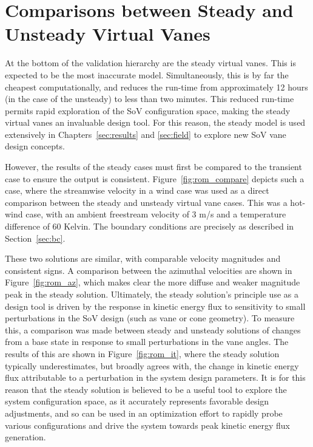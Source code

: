 \section{Comparisons between Steady and Unsteady Virtual Vanes}
\label{sec:steady_val}

At the bottom of the validation hierarchy are the steady virtual
vanes. This is expected to be the most inaccurate model. 
Simultaneously, this is by far the cheapest computationally, and 
reduces the run-time from approximately 12 hours (in the case of the
unsteady) to less than two minutes. This reduced run-time permits
rapid exploration of the SoV configuration space, making the steady
virtual vanes an invaluable design tool. For this reason, the steady
model is used extensively in Chapters~\ref{sec:results} and
\ref{sec:field} to explore new SoV vane design concepts. 

However, the results of the steady cases must first be
compared to the transient case to ensure the output is consistent. 
Figure~\ref{fig:rom_compare} depicts such a case, where the streamwise
velocity in a wind case was used as a direct comparison between the
steady and unsteady virtual vane cases. This was a hot-wind case, with
an ambient freestream velocity of 3 m/s and a temperature difference of 60
Kelvin. The boundary conditions are precisely as described in
Section~\ref{sec:bc}. 

These two solutions are similar, with comparable velocity magnitudes and 
consistent signs. A comparison between the azimuthal velocities are
shown in Figure~\ref{fig:rom_az}, which makes clear the more diffuse and
weaker magnitude peak in the steady solution. Ultimately, the steady
solution's principle use as a design tool is driven by the response in
kinetic energy flux to sensitivity to small perturbations in the SoV
design (such as vane or cone geometry). To measure this, a comparison
was made between steady and unsteady solutions of changes from a base state 
in response to
small perturbations in the vane angles. The results of this are shown in
Figure~\ref{fig:rom_it}, where the steady solution typically
underestimates, but broadly agrees with, the change in kinetic energy
flux attributable to a perturbation in the system design parameters. 
It is for this reason that the steady solution is believed to be a
useful tool to explore the system configuration space, as it accurately
represents favorable design adjustments, and so can be used in an
optimization effort to rapidly probe various configurations and drive
the system towards peak kinetic energy flux generation. 


